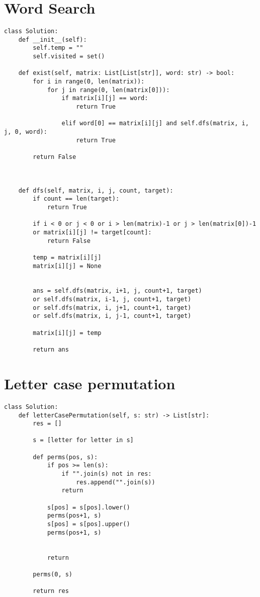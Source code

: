 \documentclass[a4]{article}
\begin{document}
\section{Word Search}
\begin{lstlisting}
class Solution:
    def __init__(self):
        self.temp = ""
        self.visited = set()
    
    def exist(self, matrix: List[List[str]], word: str) -> bool:
        for i in range(0, len(matrix)):
            for j in range(0, len(matrix[0])):
                if matrix[i][j] == word:
                    return True
                
                elif word[0] == matrix[i][j] and self.dfs(matrix, i, j, 0, word):
                    return True
        
        return False
    
    
    
    def dfs(self, matrix, i, j, count, target):
        if count == len(target):
            return True
        
        if i < 0 or j < 0 or i > len(matrix)-1 or j > len(matrix[0])-1 
        or matrix[i][j] != target[count]:
            return False
        
        temp = matrix[i][j]
        matrix[i][j] = None
        
                        
        ans = self.dfs(matrix, i+1, j, count+1, target) 
        or self.dfs(matrix, i-1, j, count+1, target) 
        or self.dfs(matrix, i, j+1, count+1, target) 
        or self.dfs(matrix, i, j-1, count+1, target)
        
        matrix[i][j] = temp
                        
        return ans
\end{lstlisting}

\newpage
\section{Letter case permutation}
\begin{lstlisting}
class Solution:
    def letterCasePermutation(self, s: str) -> List[str]:
        res = []
        
        s = [letter for letter in s]
        
        def perms(pos, s):
            if pos >= len(s):
                if "".join(s) not in res:
                    res.append("".join(s))
                return
            
            s[pos] = s[pos].lower()
            perms(pos+1, s)
            s[pos] = s[pos].upper()
            perms(pos+1, s)
            
            
            return
        
        perms(0, s)
        
        return res
\end{lstlisting}
\end{document}
